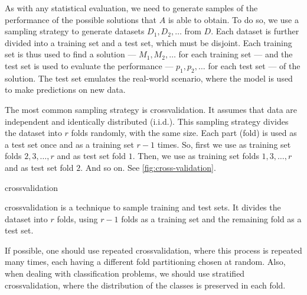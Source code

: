 As with any statistical evaluation, we need to generate samples
of the performance of the possible solutions that $A$ is able to obtain. To do so, we use
a sampling strategy to generate datasets $D_1, D_2, \ldots$ from $D$.  Each
dataset is further divided into a training set and a test set, which must be disjoint.
Each training set is thus used to find a solution --- $M_1, M_2, \ldots$ for each
training set --- and the test set is used to evaluate the performance --- $p_1, p_2,
\ldots$ for each test set --- of the solution.  The test set emulates the real-world
scenario, where the \gls{model} is used to make predictions on new data.

The most common sampling strategy is \gls{crossvalidation}.  It assumes that data are
independent and identically distributed (i.i.d.).  This sampling strategy divides
the dataset into $r$ folds randomly, with the same size.  Each part (fold) is used as a
test set once and as a training set $r-1$ times.  So, first we use as training set folds
$2, 3, \ldots, r$ and as test set fold $1$.  Then, we use as training set folds $1, 3,
\ldots, r$ and as test set fold $2$. And so on.  See \cref{fig:cross-validation}.

\begin{figurebox}[label=fig:cross-validation]{\Gls{crossvalidation}}
  \centering
  \tcblower
  \Gls{crossvalidation} is a technique to sample training and test sets.  It divides the
  dataset into $r$ folds, using $r-1$ folds as a training set and the remaining fold as a
  test set.
\end{figurebox}

If possible, one should use repeated \gls{crossvalidation}, where this process is repeated many
times, each having a different fold partitioning chosen at random.  Also, when dealing with
classification problems, we should use stratified \gls{crossvalidation}, where the distribution
of the classes is preserved in each fold.

